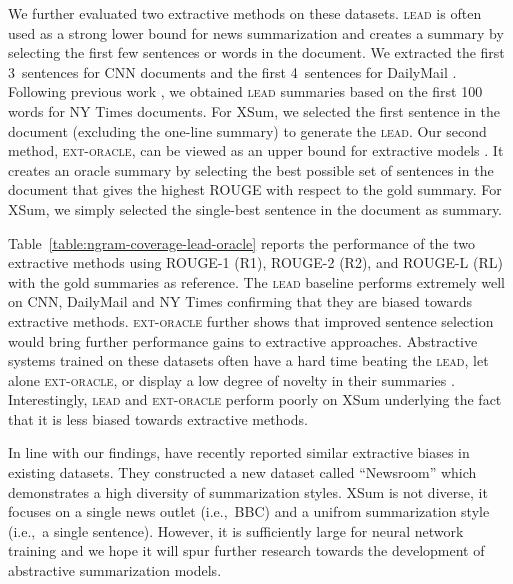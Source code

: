 We further evaluated two extractive methods on these datasets.
\textsc{lead} is often used as a strong lower bound for news
summarization \cite{nenkova-05} and creates a summary by selecting the
first few sentences or words in the document. We extracted the first
3~sentences for CNN documents and the first 4~sentences for DailyMail
\cite{narayan-rank18}. Following previous work
\cite{durrett-nyt-ext,paulus-socher-arxiv17}, we obtained
\textsc{lead} summaries based on the first 100 words for NY Times
documents. %
For XSum, we selected the first sentence
in the document (excluding the one-line summary) to generate the
\textsc{lead}. Our second method, \textsc{ext-oracle}, can be viewed
as an upper bound for extractive models
\cite{nallapati17,narayan-rank18}. It creates an oracle summary by
selecting the best possible set of sentences in the document that
gives the highest ROUGE \cite{rouge} with respect to the gold
summary. For XSum, we simply selected the single-best sentence in the
document as summary.

Table~\ref{table:ngram-coverage-lead-oracle} reports the performance
of the two extractive methods using ROUGE-1 (R1), ROUGE-2 (R2), and
ROUGE-L (RL) with the gold summaries as reference. The \textsc{lead}
baseline performs extremely well on CNN, DailyMail and NY
Times %
confirming that they are biased towards extractive methods.
\textsc{ext-oracle} further shows that improved sentence selection
would bring further performance gains to extractive
approaches. Abstractive systems trained on these datasets often have a
hard time beating the \textsc{lead}, let alone \textsc{ext-oracle}, or
display a low degree of novelty in their summaries
\cite{see-acl17,tanwan-acl17,paulus-socher-arxiv17,Pasunuru-multireward18,asli-multiagent18}.
Interestingly, \textsc{lead} and \textsc{ext-oracle} perform poorly on
XSum underlying the fact that it is less biased towards extractive
methods.




In line with our findings,  have recently
reported similar extractive biases in existing datasets. They
constructed a new dataset called ``Newsroom'' which demonstrates a
high diversity of summarization styles. XSum is not diverse, it
focuses on a single news outlet (i.e.,~BBC) and a unifrom
summarization style (i.e.,~a single sentence). However, it is
sufficiently large for neural network training and we hope it will
spur further research towards the development of abstractive
summarization models.


